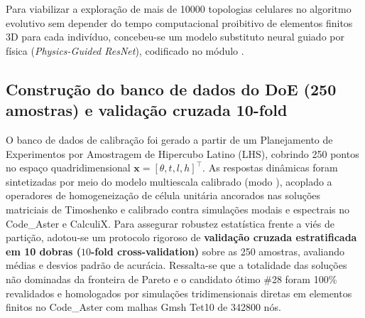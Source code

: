 Para viabilizar a exploração de mais de \num{10000} topologias celulares no algoritmo evolutivo sem depender do tempo computacional proibitivo de elementos finitos 3D para cada indivíduo, concebeu-se um modelo substituto neural guiado por física (\textit{Physics-Guided ResNet}), codificado no módulo .

\subsection{Construção do banco de dados do DoE (250 amostras) e validação cruzada 10-fold}
O banco de dados de calibração foi gerado a partir de um Planejamento de Experimentos por Amostragem de Hipercubo Latino (LHS), cobrindo 250 pontos no espaço quadridimensional $\mathbf{x} = [\theta, t, l, h]^{\top}$. As respostas dinâmicas foram sintetizadas por meio do modelo multiescala calibrado  (modo ), acoplado a operadores de homogeneização de célula unitária ancorados nas soluções matriciais de Timoshenko e calibrado contra simulações modais e espectrais no Code\_Aster e CalculiX. Para assegurar robustez estatística frente a viés de partição, adotou-se um protocolo rigoroso de \textbf{validação cruzada estratificada em 10 dobras ($10$-fold cross-validation)} sobre as 250 amostras, avaliando médias e desvios padrão de acurácia. Ressalta-se que a totalidade das soluções não dominadas da fronteira de Pareto e o candidato ótimo \#28 foram 100\% revalidados e homologados por simulações tridimensionais diretas em elementos finitos no Code\_Aster com malhas Gmsh Tet10 de \num{342800} nós.

